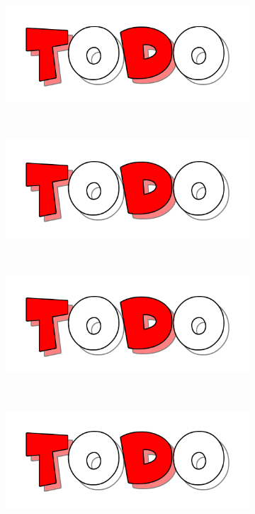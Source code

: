\documentclass[a4paper, 11pt]{article}
\begin{document}
\begin{figure}
\begin{subfigure}[b]{0.24\textwidth}
\end{subfigure}\\
\begin{subfigure}[b]{0.24\textwidth}
\includegraphics[width=\textwidth]{Todo}
\end{subfigure}~
\begin{subfigure}[b]{0.24\textwidth}
\includegraphics[width=\textwidth]{Todo}
\end{subfigure}~
\begin{subfigure}[b]{0.24\textwidth}
\includegraphics[width=\textwidth]{Todo}
\end{subfigure}~
\begin{subfigure}[b]{0.24\textwidth}
\includegraphics[width=\textwidth]{Todo}

\end{subfigure}
\end{figure}
\end{document}
